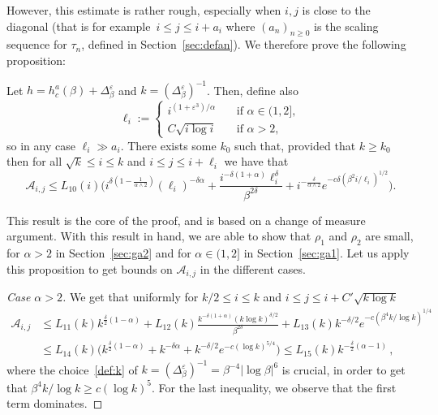 \documentclass[AHL,Unicode,longabstracts]{cedram}
\newenvironment{step}[1]{\begin{proof}[#1]}{\let\qed\relax\end{proof}}
\newcommand{\ga}{\alpha}
\newcommand{\gb}{\beta}
\newcommand{\gd}{\delta}
\newcommand{\gep}{\varepsilon}
\newcommand{\gD}{\Delta}
\newcommand{\cA}{\ensuremath{\mathcal{A}}}
\begin{document}
However, this estimate is rather rough, especially when $i,j$ is close to the diagonal (that is for example~$i\leq j \leq i + a_i$ where ${(a_n)}_{n \ge 0}$ is the scaling sequence for $\tau_n$, defined in Section~\ref{sec:defan}). We therefore prove the following proposition:
\begin{prop}\label{prop:chgmeasure}
Let $h=h_c^a(\gb)+ \gD_{\gb}^\gep$ and $k=(\gD_\gb^{\gep})^{-1}$. Then, define also
\begin{equation}\label{def:ell}
\ell_i :=
\begin{cases}
i^{(1+\gep^3)/\ga} & \quad \text{if } \ga\in(1,2],\\
C \sqrt{i\log i} & \quad \text{if } \ga>2,
\end{cases}
\end{equation}
so in any case $\ell_i \gg a_i$. There exists some $k_0$ such that, provided that $k\geq k_0$ then for all $\sqrt{k}\leq i\leq k$ and $i\leq j\leq i+\ell_i$ we have that
\begin{equation}\label{boundAij}
\cA_{i,j} \leq L_{10}(i)\Big(i^{\gd(1-\frac{1}{\ga\wedge2})} (\ell_i)^{-\gd \ga} + \frac{i^{-\gd(1+\ga)} \ell_i^{\gd}}{\gb^{2 \gd}} + i^{-\frac{\gd}{\ga\wedge 2}} e^{- c \gd (\gb^2 i /\ell_i)^{1/2}} \Big).
\end{equation}
\end{prop}

This result is the core of the proof, and is based on a change of measure argument. With this result in hand, we are able to show that $\rho_1$ and $\rho_2$ are small, for $\ga>2$ in Section~\ref{sec:ga2} and for $\ga\in(1,2]$ in Section~\ref{sec:ga1}. Let us apply this proposition to get bounds on $\cA_{i,j}$ in the different cases.



\begin{step}{Case $\ga>2$}
We get that uniformly for $k/2 \leq i\leq k$ and $i\leq j\leq i+ C' \sqrt{k\log k}$
\begin{align}
\nonumber\cA_{i,j} & \leq L_{11}(k) k^{\frac{\gd}{2} (1-\ga)} + L_{12}(k) \frac{k^{-\gd (1+\ga)} (k \log k)^{\gd/2}}{\gb^{2 \gd}} + L_{13}(k) k^{- \gd/2} e^{- c (\gb^4 k /\log k)^{1/4}} \\
& \leq L_{14}(k) \Big(k^{\frac{\gd}{2} (1-\ga)} + k^{-\gd \ga} + k^{- \gd/2} e^{- c(\log k)^{5/4} }\Big) \leq L_{15}(k) k^{-\frac{\gd}{2} (\ga-1)}\,,\label{boundA2}
\end{align}
where the choice~\eqref{def:k} of $k=(\gD_{\gb}^{\gep})^{-1} = \gb^{-4} \mathopen|\log \gb|^{6}$ is crucial, in order to get that $\gb^4 k /\log k \geq c (\log k)^5$. For the last inequality, we observe that the first term dominates.
\end{step}
\end{document}
